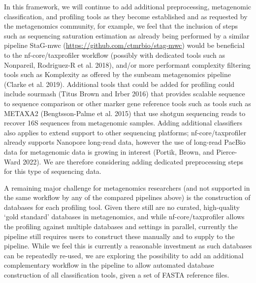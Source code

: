 \documentclass[
]{article}
\begin{document}
In this framework, we will continue to add additional preprocessing,
metagenomic classification, and profiling tools as they become
established and as requested by the metagenomics community, for example,
we feel that the inclusion of steps such as sequencing saturation
estimation as already being performed by a similar pipeline StaG-mwc
(\url{https://github.com/ctmrbio/stag-mwc}) would be beneficial to the
nf-core/taxprofiler workflow (possibly with dedicated tools such as
Nonpareil, Rodriguez-R et al. 2018), and/or more performant complexity
filtering tools such as Komplexity as offered by the sunbeam
metagenomics pipeline (Clarke et al. 2019). Additional tools that could
be added for profiling could include sourmash (Titus Brown and Irber
2016) that provides scalable sequence to sequence comparison or other
marker gene reference tools such as tools such as METAXA2
(Bengtsson-Palme et al. 2015) that use shotgun sequencing reads to
recover 16S sequences from metagenomic samples. Adding additional
classifiers also applies to extend support to other sequencing
platforms; nf-core/taxprofiler already supports Nanopore long-read data,
however the use of long-read PacBio data for metagenomic data is growing
in interest (Portik, Brown, and Pierce-Ward 2022). We are therefore
considering adding dedicated preprocessing steps for this type of
sequencing data.

A remaining major challenge for metagenomics researchers (and not
supported in the same workflow by any of the compared pipelines above)
is the construction of databases for each profiling tool. Given there
still are no curated, high-quality `gold standard' databases in
metagenomics, and while nf-core/taxprofiler allows the profiling against
multiple databases and settings in parallel, currently the pipeline
still requires users to construct these manually and to supply to the
pipeline. While we feel this is currently a reasonable investment as
such databases can be repeatedly re-used, we are exploring the
possibility to add an additional complementary workflow in the pipeline
to allow automated database construction of all classification tools,
given a set of FASTA reference files.
\end{document}
